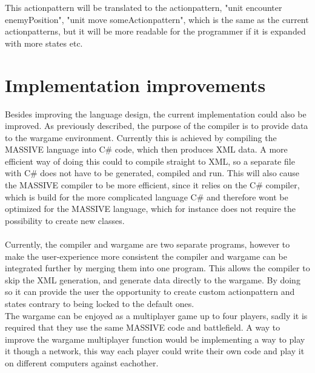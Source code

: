 This actionpattern will be translated to the actionpattern, "unit encounter enemyPosition", "unit move someActionpattern", which is the same as the current actionpatterns, but it will be more readable for the programmer if it is expanded with more states etc.


\section{Implementation improvements}
Besides improving the language design, the current implementation could also be improved. As previously described, the purpose of the compiler is to provide data to the wargame environment.
Currently this is achieved by compiling the MASSIVE language into C\# code, which then produces XML data. 
A more efficient way of doing this could to compile straight to XML, so a separate file with C\# does not have to be generated, compiled and run. 
This will also cause the MASSIVE compiler to be more efficient, since it relies on the C\# compiler, which is build for the more complicated language C\# and therefore wont be optimized for the MASSIVE language, which for instance does not require the possibility to create new classes.\\
 \\
Currently, the compiler and wargame are two separate programs, however to make the user-experience more consistent the compiler and wargame can be integrated further by merging them into one program.
This allows the compiler to skip the XML generation, and generate data directly to the wargame. By doing so it can provide the user the opportunity to create custom actionpattern and states contrary to being locked to the default ones.\newline
 \\
The wargame can be enjoyed as a multiplayer game up to four players, sadly it is required that they use the same MASSIVE code and battlefield. A way to improve the wargame multiplayer function would be implementing a way to play it though a network, this way each player could write their own code and play it on different computers against eachother.\\
\\
